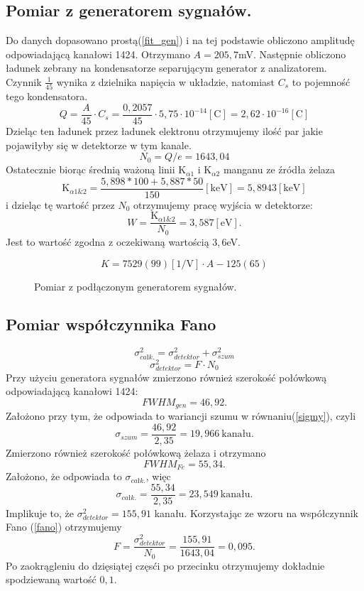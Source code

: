 \documentclass[11pt,a4paper]{article}
\begin{document}
\subsection{Pomiar z generatorem sygnałów.}
Do danych dopasowano prostą(\ref{fit_gen}) i na tej podstawie obliczono amplitudę odpowiadającą kanałowi 1424. 
Otrzymano $A = 205,7$mV.
Następnie obliczono ładunek zebrany na kondensatorze separującym generator z analizatorem. 
Czynnik $\frac{1}{45}$ wynika z dzielnika napięcia w układzie, natomiast $C_s$ to pojemność tego kondensatora.
$$
Q=\frac{A}{45} \cdot C_s = \frac{0,2057}{45}\cdot 5,75\cdot 10^{-14} [\text{C}] = 2,62\cdot 10^{-16} [\text{C}]
$$
Dzieląc ten ładunek przez ładunek elektronu otrzymujemy ilość par jakie pojawiłyby się w detektorze w tym kanale.
$$
N_0 = Q/e = 1643,04
$$
Ostatecznie biorąc średnią ważoną linii K$_{\alpha 1}$ i K$_{\alpha 2}$ manganu ze źródła żelaza
$$
\text{K}_{\alpha 1\&2} = \frac{5,898*100 + 5,887*50}{150} [\text{keV}]=5,8943 [\text{keV}]
$$
i dzieląc tę wartość przez $N_0$ otrzymujemy pracę wyjścia w detektorze:
\begin{equation}
	W = \frac{\text{K}_{\alpha 1\&2}}{N_0} = 3,587 [\text{eV}].
\end{equation}
Jest to wartość zgodna z oczekiwaną wartością $3,6$eV.

\begin{equation}
	K = 7529(99)[\text{1/V}] \cdot A -125(65)
	\label{fit_gen}
\end{equation}
\begin{figure}[H]
\centering
\resizebox{.8\linewidth}{!}{}
\caption{Pomiar z podłączonym generatorem sygnałów.}
\label{fig1}
\end{figure}

\subsection{Pomiar współczynnika Fano}
\begin{equation}
	\sigma_{całk.}^2 = \sigma_{detektor}^2 + \sigma_{szum}^2
	\label{sigmy}
\end{equation}
\begin{equation}
	\sigma_{detektor}^2 = F\cdot N_0
	\label{fano}
\end{equation}
Przy użyciu generatora sygnałów zmierzono również szerokość połówkową odpowiadającą kanałowi 1424:
$$FWHM_{gen} = 46,92.$$
Założono przy tym, że odpowiada to wariancji szumu w równaniu(\ref{sigmy}), czyli
$$\sigma_{szum} = \frac{46,92}{2,35} = 19,966~ \text{kanału}. $$
Zmierzono również szerokość połówkową żelaza i otrzymano
$$FWHM_{Fe} = 55,34.$$
Założono, że odpowiada to $\sigma_{całk.}$, więc
$$\sigma_{całk.} = \frac{55,34}{2,35} = 23,549~ \text{kanału}.$$
Implikuje to, że $\sigma_{detektor}^2 = 155,91$ kanału.
Korzystając ze wzoru na współczynnik Fano (\ref{fano}) otrzymujemy
$$ F = \frac{\sigma_{detektor}^2}{N_0} = \frac{155,91}{1643,04} = 0,095.$$
Po zaokrągleniu do dzięsiątej częsći po przecinku otrzymujemy dokładnie spodziewaną wartość $0,1$.
\end{document}
